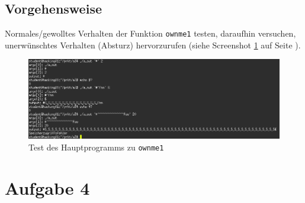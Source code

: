 \documentclass[11pt,a4paper]{article}
\begin{document}
\subsection{Vorgehensweise}
Normales/gewolltes Verhalten der Funktion \texttt{ownme1} testen, daraufhin versuchen, unerwünschtes Verhalten (Absturz) hervorzurufen (siehe Screenshot \ref{a3_0} auf Seite \pageref{a3_0}).
\begin{figure}[h!]
  \caption{Test des Hauptprogramms zu \texttt{ownme1}}
  \label{a3_0}
  \centering
    \includegraphics[scale=0.5]{a3_0.png}
\end{figure}
\section{Aufgabe 4}
\end{document}
